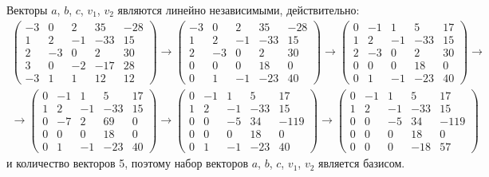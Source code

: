 \documentclass[12pt]{article}
\begin{document}
    Векторы $a$, $b$, $c$, $v_1$, $v_2$ являются линейно независимыми, действительно:
    \begin{gather*}
        \begin{pmatrix}
            -3 & 0  & 2  & 35  & -28 \\
            1  & 2  & -1 & -33 & 15  \\
            2  & -3 & 0  & 2   & 30  \\
            3  & 0  & -2 & -17 & 28  \\
            -3 & 1  & 1  & 12  & 12
        \end{pmatrix}
        \rightarrow
        \begin{pmatrix}
            -3 & 0  & 2  & 35  & -28 \\
            1  & 2  & -1 & -33 & 15  \\
            2  & -3 & 0  & 2   & 30  \\
            0  & 0  & 0  & 18  & 0   \\
            0  & 1  & -1 & -23 & 40
        \end{pmatrix}
        \rightarrow
        \begin{pmatrix}
            0 & -1 & 1  & 5   & 17 \\
            1 & 2  & -1 & -33 & 15 \\
            2 & -3 & 0  & 2   & 30 \\
            0 & 0  & 0  & 18  & 0  \\
            0 & 1  & -1 & -23 & 40
        \end{pmatrix}
        \rightarrow \\
        \rightarrow
        \begin{pmatrix}
            0 & -1 & 1  & 5   & 17 \\
            1 & 2  & -1 & -33 & 15 \\
            0 & -7 & 2  & 69  & 0  \\
            0 & 0  & 0  & 18  & 0  \\
            0 & 1  & -1 & -23 & 40
        \end{pmatrix}
        \rightarrow
        \begin{pmatrix}
            0 & -1 & 1  & 5   & 17   \\
            1 & 2  & -1 & -33 & 15   \\
            0 & 0  & -5 & 34  & -119 \\
            0 & 0  & 0  & 18  & 0    \\
            0 & 1  & -1 & -23 & 40
        \end{pmatrix}
        \rightarrow
        \begin{pmatrix}
            0 & -1 & 1  & 5   & 17   \\
            1 & 2  & -1 & -33 & 15   \\
            0 & 0  & -5 & 34  & -119 \\
            0 & 0  & 0  & 18  & 0    \\
            0 & 0  & 0  & -18 & 57
        \end{pmatrix}
    \end{gather*}
    и количество векторов 5, поэтому набор векторов $a$, $b$, $c$, $v_1$, $v_2$ является базисом.
\end{document}
